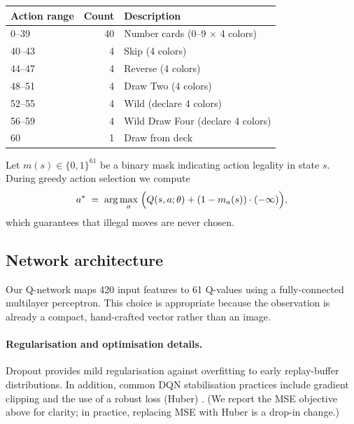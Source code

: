 \documentclass[11pt]{article}
\begin{document}
\begin{center}
\begin{tabular}{@{}lrl@{}}
\toprule
Action range & Count & Description \\
\midrule
0--39 & 40 & Number cards (0--9 $\times$ 4 colors) \\
40--43 & 4 & Skip (4 colors) \\
44--47 & 4 & Reverse (4 colors) \\
48--51 & 4 & Draw Two (4 colors) \\
52--55 & 4 & Wild (declare 4 colors) \\
56--59 & 4 & Wild Draw Four (declare 4 colors) \\
60 & 1 & Draw from deck \\
\bottomrule
\end{tabular}
\end{center}

Let $m(s)\in\{0,1\}^{61}$ be a binary mask indicating action legality in state $s$. During greedy action selection we compute
\begin{equation}
  a^* \;=\; \arg\max_{a}\; \Bigl(Q(s,a;\theta) + (1-m_a(s))\cdot (-\infty)\Bigr),
\end{equation}
which guarantees that illegal moves are never chosen.

\subsection{Network architecture}
Our Q-network maps 420 input features to 61 Q-values using a fully-connected multilayer perceptron. This choice is appropriate because the observation is already a compact, hand-crafted vector rather than an image.

\begin{center}
\end{center}

\paragraph{Regularisation and optimisation details.}
Dropout provides mild regularisation against overfitting to early replay-buffer distributions. In addition, common DQN stabilisation practices include gradient clipping and the use of a robust loss (Huber) \parencite{mnih2015human}. (We report the MSE objective above for clarity; in practice, replacing MSE with Huber is a drop-in change.)
\end{document}
